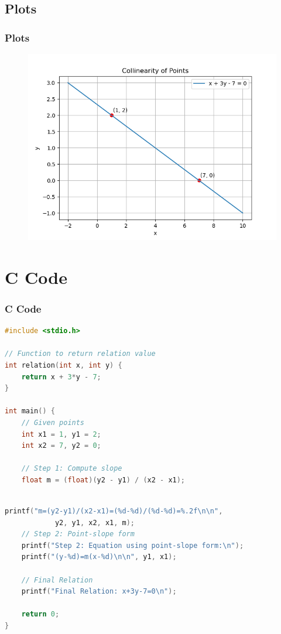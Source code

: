 \documentclass{beamer}
\theoremstyle{remark}
\numberwithin{equation}{section}
\begin{document}
\subsection{Plots}
\begin{frame}
\frametitle{Plots}
\begin{figure}
\centering
\includegraphics[width=0.7\columnwidth]{figs/fig1.png}
\caption{}
\label{fig:placeholder}
\end{figure}
\end{frame}
\section{C Code}
\begin{frame}[fragile]
\frametitle{C Code }
\begin{lstlisting}[language=C]
#include <stdio.h>

// Function to return relation value
int relation(int x, int y) {
    return x + 3*y - 7;
}

int main() {
    // Given points
    int x1 = 1, y1 = 2;
    int x2 = 7, y2 = 0;

    // Step 1: Compute slope
    float m = (float)(y2 - y1) / (x2 - x1);
  
\end{lstlisting}
\end{frame}
\begin{frame}[fragile]
 \begin{lstlisting}[language=C]
 printf("m=(y2-y1)/(x2-x1)=(%d-%d)/(%d-%d)=%.2f\n\n",
            y2, y1, x2, x1, m);
    // Step 2: Point-slope form
    printf("Step 2: Equation using point-slope form:\n");
    printf("(y-%d)=m(x-%d)\n\n", y1, x1);

    // Final Relation
    printf("Final Relation: x+3y-7=0\n");

    return 0;
}
    
\end{lstlisting}
\end{frame}
\end{document}
